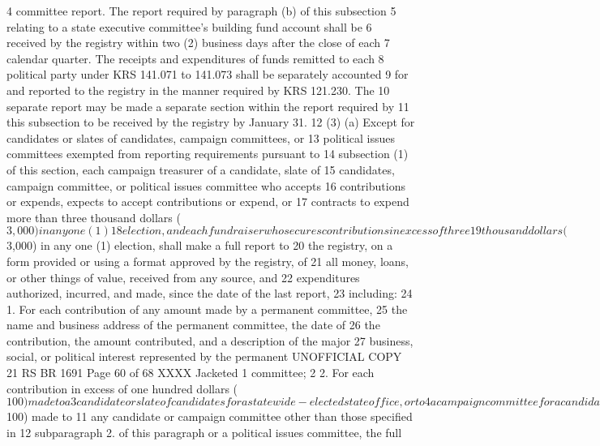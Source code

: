 4 committee report. The report required by paragraph (b) of this subsection
5 relating to a state executive committee's building fund account shall be
6 received by the registry within two (2) business days after the close of each
7 calendar quarter. The receipts and expenditures of funds remitted to each
8 political party under KRS 141.071 to 141.073 shall be separately accounted
9 for and reported to the registry in the manner required by KRS 121.230. The
10 separate report may be made a separate section within the report required by
11 this subsection to be received by the registry by January 31.
12 (3) (a) Except for candidates or slates of candidates, campaign committees, or
13 political issues committees exempted from reporting requirements pursuant to
14 subsection (1) of this section, each campaign treasurer of a candidate, slate of
15 candidates, campaign committee, or political issues committee who accepts
16 contributions or expends, expects to accept contributions or expend, or
17 contracts to expend more than three thousand dollars ($3,000) in any one (1)
18 election, and each fundraiser who secures contributions in excess of three
19 thousand dollars ($3,000) in any one (1) election, shall make a full report to
20 the registry, on a form provided or using a format approved by the registry, of
21 all money, loans, or other things of value, received from any source, and
22 expenditures authorized, incurred, and made, since the date of the last report,
23 including:
24 1. For each contribution of any amount made by a permanent committee,
25 the name and business address of the permanent committee, the date of
26 the contribution, the amount contributed, and a description of the major
27 business, social, or political interest represented by the permanent 
UNOFFICIAL COPY 21 RS BR 1691
Page 60 of 68
XXXX Jacketed
1 committee;
2 2. For each contribution in excess of one hundred dollars ($100) made to a
3 candidate or slate of candidates for a statewide-elected state office, or to
4 a campaign committee for a candidate or slate of candidates for a
5 statewide-elected state office, the date, name, address, occupation, and
6 employer of each contributor and the spouse of the contributor or, if the
7 contributor or spouse of the contributor is self-employed, the name
8 under which he or she is doing business, and the amount contributed by
9 each contributor;
10 3. For each contribution in excess of one hundred dollars ($100) made to
11 any candidate or campaign committee other than those specified in
12 subparagraph 2. of this paragraph or a political issues committee, the full
